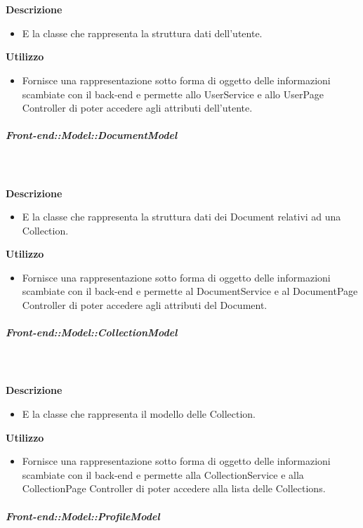 \begin{itemize}
        \textbf{\\ \\ Descrizione} 
          \begin{itemize}
            \item[] E la classe che rappresenta la struttura dati dell'utente.
          \end{itemize}      
        \textbf{Utilizzo}  
          \begin{itemize}
            \item[] Fornisce una rappresentazione sotto forma di oggetto delle informazioni scambiate con il back-end e permette allo UserService e allo UserPage Controller di poter accedere agli attributi dell'utente.
          \end{itemize}
      \subparagraph{Front-end::Model::DocumentModel}
        
        \textbf{\\ \\ Descrizione} 
          \begin{itemize}
            \item[] E la classe che rappresenta la struttura dati dei Document relativi ad una Collection.
          \end{itemize}      
        \textbf{Utilizzo}  
          \begin{itemize}
            \item[] Fornisce una rappresentazione sotto forma di oggetto delle informazioni scambiate con il back-end e permette al DocumentService e al DocumentPage Controller di poter accedere agli attributi del Document.
          \end{itemize}
      \subparagraph{Front-end::Model::CollectionModel}
        
        \textbf{\\ \\ Descrizione} 
          \begin{itemize}
            \item[] E la classe che rappresenta il modello delle Collection.
          \end{itemize}      
        \textbf{Utilizzo}  
          \begin{itemize}
            \item[] Fornisce una rappresentazione sotto forma di oggetto delle informazioni scambiate con il back-end e permette alla CollectionService e alla CollectionPage Controller di poter accedere alla lista delle Collections.
          \end{itemize}
      \subparagraph{Front-end::Model::ProfileModel}
        

\end{itemize}
